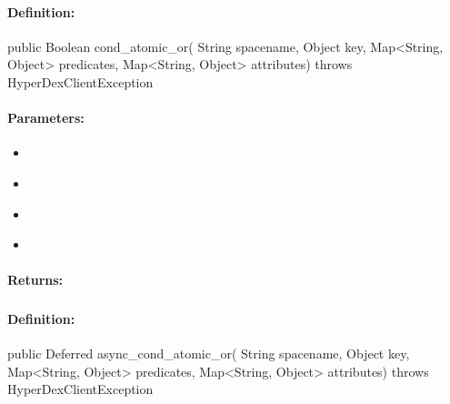 \paragraph{Definition:}
\begin{javacode}
public Boolean cond_atomic_or(
        String spacename,
        Object key,
        Map<String, Object> predicates,
        Map<String, Object> attributes) throws HyperDexClientException
\end{javacode}

\paragraph{Parameters:}
\begin{itemize}[noitemsep]
\item {}\\

\item {}\\

\item {}\\

\item {}\\

\end{itemize}

\paragraph{Returns:}


\pagebreak
\subsubsection{}
\label{api:java:async_cond_atomic_or}


\paragraph{Definition:}
\begin{javacode}
public Deferred async_cond_atomic_or(
        String spacename,
        Object key,
        Map<String, Object> predicates,
        Map<String, Object> attributes) throws HyperDexClientException
\end{javacode}

